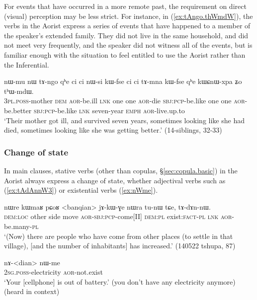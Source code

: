 For events that have occurred in a more remote past, the requirement on direct (visual) perception may be less strict. For instance, in (\ref{ex:tAngo.thWmdW}), the verbs in the Aorist express a series of events that have happened to a member of the speaker's extended family. They did not live in the same household, and did not meet very frequently, and the speaker did not witness all of the events, but is familiar enough with the situation to feel entitled to use the Aorist rather than the Inferential.

\begin{exe}
\ex \label{ex:tAngo.thWmdW}
 \gll nɯ-mu nɯ tɤ-ngo qʰe ci ci nɯ-si kɯ-fse ci ci tɤ-mna kɯ-fse qʰe kɯɕnɯ-xpa ʑo tʰɯ-mdɯ. \\
 \textsc{3pl}.\textsc{poss}-mother \textsc{dem} \textsc{aor}-be.ill \textsc{lnk} one one \textsc{aor}-die \textsc{sbj}:\textsc{pcp}-be.like  one one \textsc{aor}-be.better  \textsc{sbj}:\textsc{pcp}-be.like \textsc{lnk} seven-year \textsc{emph} \textsc{aor}-live.up.to \\
\glt `Their mother got ill, and survived seven years, sometimes looking like she had died, sometimes looking like she was getting better.' (14-siblings, 32-33)
\end{exe}

\subsubsection{Change of state}   \label{sec:aor.inchoative}
In main clauses, stative verbs (other than copulas, §\ref{sec:copula.basic}) in the Aorist always express a change of state, whether adjectival verbs such as  (\ref{ex:tAdAnnW3}) or existential verbs (\ref{ex:nWme}).

\begin{exe}
\ex \label{ex:tAdAnnW3}
 \gll nɯre kɯmaʁ pɕoʁ <banqian> jɤ-kɯ-ɣe nɯra tu-nɯ tɕe, tɤ-dɤn-nɯ. \\
 \textsc{dem}:\textsc{loc} other side move \textsc{aor}-\textsc{sbj}:\textsc{pcp}-come[II] \textsc{dem}:\textsc{pl} exist:\textsc{fact}-\textsc{pl} \textsc{lnk} \textsc{aor}-be.many-\textsc{pl} \\
 \glt `(Now) there are people who have come from other places (to settle in that village), [and the number of inhabitants] has increased.' (140522 tshupa, 87)
\end{exe}


\begin{exe}
\ex \label{ex:nWme}
 \gll nɤ-<dian> nɯ-me \\
 \textsc{2sg}.\textsc{poss}-electricity \textsc{aor}-not.exist \\
 \glt `Your [cellphone] is out of battery.' (you don't have any electricity anymore) (heard in context)
\end{exe}

